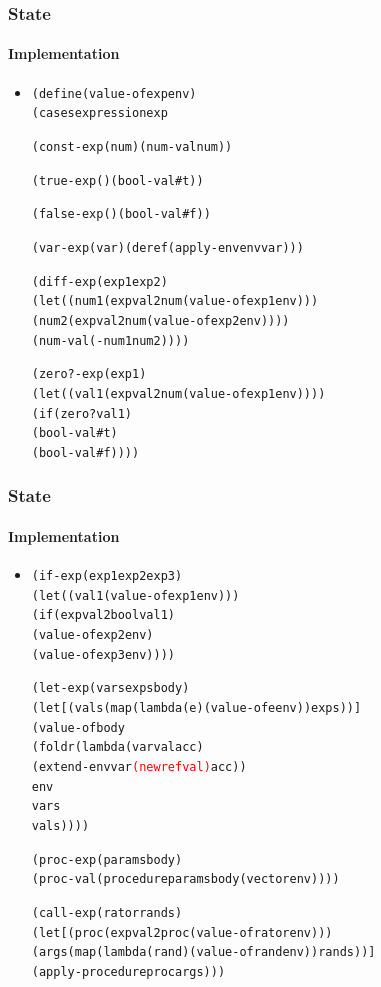 \documentclass{beamer}
\begin{document}
\begin{frame}[fragile]
\frametitle{State}
\framesubtitle{Implementation}
\begin{scriptsize}
\begin{itemize}
\item<1->
\begin{alltt}
(define (value-of exp env)
  (cases expression exp

    (const-exp (num) (num-val num))

    (true-exp () (bool-val #t))

    (false-exp () (bool-val #f))

    (var-exp (var) (deref (apply-env env var)))

    (diff-exp (exp1 exp2)
              (let ((num1 (expval2num (value-of exp1 env)))
                    (num2 (expval2num (value-of exp2 env))))
                (num-val (- num1 num2))))

    (zero?-exp (exp1)
               (let ((val1 (expval2num (value-of exp1 env))))
                 (if (zero? val1)
                     (bool-val #t)
                     (bool-val #f))))
\end{alltt}

\end{itemize}
\end{scriptsize}
\end{frame}

\begin{frame}[fragile]
\frametitle{State}
\framesubtitle{Implementation}
\begin{scriptsize}
\begin{itemize}
\item<1->
\begin{alltt}
    (if-exp (exp1 exp2 exp3)
        (let ((val1 (value-of exp1 env)))
          (if (expval2bool val1)
              (value-of exp2 env)
              (value-of exp3 env))))

    (let-exp (vars exps body)
             (let [(vals (map (lambda (e) (value-of e env)) exps))]
              (value-of body
                        (foldr (lambda (var val acc)
                                (extend-env var \textcolor{red}{(newref val)} acc))
                               env
                               vars
                               vals))))

    (proc-exp (params body)
              (proc-val (procedure params body (vector env))))

    (call-exp (rator rands)
              (let [(proc (expval2proc (value-of rator env)))
                    (args (map (lambda (rand) (value-of rand env)) rands))]
                (apply-procedure proc args)))
\end{alltt}

\end{itemize}
\end{scriptsize}
\end{frame}
\end{document}

